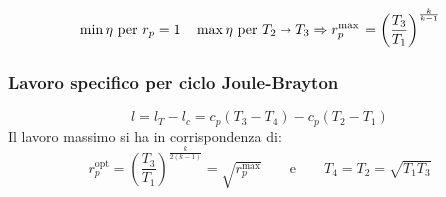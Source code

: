 \begin{align*}
    \min \eta ~\text{per}~ r_p = 1 \quad \max \eta ~\text{per}~ T_2 \shortrightarrow T_3 \Rightarrow r_{p}^{\max{}} = \left(\frac{T_3}{T_1}\right)^\frac{k}{k-1}
\end{align*}

\subsubsection{Lavoro specifico per ciclo Joule-Brayton}
\[
    l = l_T - l_c = c_p (T_3 - T_4) - c_p (T_2 - T_1)
\]
Il lavoro massimo si ha in corrispondenza di:
\[
    r_p^{\text{opt}} = \left(\frac{T_3}{T_1}\right)^\frac{k}{2(k-1)} = \sqrt{r_p^{\max{}}} \qquad\text{e}\qquad T_4 = T_2 = \sqrt{T_1T_3}
\]
